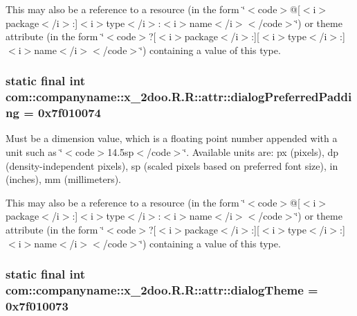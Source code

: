 This may also be a reference to a resource (in the form \char`\"{}$<$code$>$@\mbox{[}$<$i$>$package$<$/i$>$:\mbox{]}$<$i$>$type$<$/i$>$:$<$i$>$name$<$/i$>$$<$/code$>$\char`\"{}) or theme attribute (in the form \char`\"{}$<$code$>$?\mbox{[}$<$i$>$package$<$/i$>$:\mbox{]}\mbox{[}$<$i$>$type$<$/i$>$:\mbox{]}$<$i$>$name$<$/i$>$$<$/code$>$\char`\"{}) containing a value of this type. \hypertarget{classcom_1_1companyname_1_1x__2doo_1_1_r_1_1attr_f38e57c17b33b1d762131914732d3896}{
\subsubsection[{dialogPreferredPadding}]{\setlength{\rightskip}{0pt plus 5cm}static final int com::companyname::x\_\-2doo.R.R::attr::dialogPreferredPadding = 0x7f010074}}
\label{classcom_1_1companyname_1_1x__2doo_1_1_r_1_1attr_f38e57c17b33b1d762131914732d3896}


Must be a dimension value, which is a floating point number appended with a unit such as \char`\"{}$<$code$>$14.5sp$<$/code$>$\char`\"{}. Available units are: px (pixels), dp (density-independent pixels), sp (scaled pixels based on preferred font size), in (inches), mm (millimeters). 

This may also be a reference to a resource (in the form \char`\"{}$<$code$>$@\mbox{[}$<$i$>$package$<$/i$>$:\mbox{]}$<$i$>$type$<$/i$>$:$<$i$>$name$<$/i$>$$<$/code$>$\char`\"{}) or theme attribute (in the form \char`\"{}$<$code$>$?\mbox{[}$<$i$>$package$<$/i$>$:\mbox{]}\mbox{[}$<$i$>$type$<$/i$>$:\mbox{]}$<$i$>$name$<$/i$>$$<$/code$>$\char`\"{}) containing a value of this type. \hypertarget{classcom_1_1companyname_1_1x__2doo_1_1_r_1_1attr_ce6d55af2d654e2e9cbed5908b964f17}{
\subsubsection[{dialogTheme}]{\setlength{\rightskip}{0pt plus 5cm}static final int com::companyname::x\_\-2doo.R.R::attr::dialogTheme = 0x7f010073}}
\label{classcom_1_1companyname_1_1x__2doo_1_1_r_1_1attr_ce6d55af2d654e2e9cbed5908b964f17}


